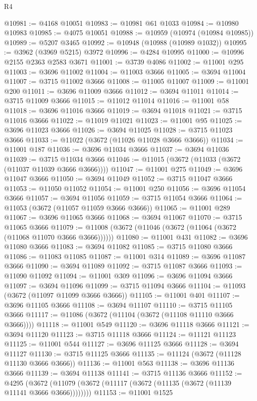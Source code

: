 \begin{lexlean}{R4}
\begin{coremodule}
@10981 := @4168 @10051
@10983 := @10981 @61 @1033
@10984 := @10980 @10983
@10985 := @4075 @10051
@10988 := @10959 (@10974 (@10984 @10985))
@10989 := @5207 @3465
@10992 := @10948 (@10988 (@10989 @1032))
@10995 := @3962 (@3969 @5215) @3972
@10996 := @4284 @10995
@11000 := @10996 @2155 @2363 @2583 @3671
@11001 := @3739 @4086
@11002 := @11001 @295
@11003 := @3696 @11002
@11004 := @11003 @3666
@11005 := @3694 @11004
@11007 := @3715 @11002 @3666
@11008 := @11005 @11007
@11009 := @11001 @200
@11011 := @3696 @11009 @3666
@11012 := @3694 @11011
@11014 := @3715 @11009 @3666
@11015 := @11012 @11014
@11016 := @11001 @58
@11018 := @3696 @11016 @3666
@11019 := @3694 @11018
@11021 := @3715 @11016 @3666
@11022 := @11019 @11021
@11023 := @11001 @95
@11025 := @3696 @11023 @3666
@11026 := @3694 @11025
@11028 := @3715 @11023 @3666
@11033 := @11022 (@3672 (@11026 @11028 @3666 @3666))
@11034 := @11001 @187
@11036 := @3696 @11034 @3666
@11037 := @3694 @11036
@11039 := @3715 @11034 @3666
@11046 := @11015 (@3672 (@11033 (@3672 (@11037 @11039 @3666 @3666))))
@11047 := @11001 @275
@11049 := @3696 @11047 @3666
@11050 := @3694 @11049
@11052 := @3715 @11047 @3666
@11053 := @11050 @11052
@11054 := @11001 @250
@11056 := @3696 @11054 @3666
@11057 := @3694 @11056
@11059 := @3715 @11054 @3666
@11064 := @11053 (@3672 (@11057 @11059 @3666 @3666))
@11065 := @11001 @289
@11067 := @3696 @11065 @3666
@11068 := @3694 @11067
@11070 := @3715 @11065 @3666
@11079 := @11008 (@3672 (@11046 (@3672 (@11064 (@3672 (@11068 @11070 @3666 @3666))))))
@11080 := @11001 @431
@11082 := @3696 @11080 @3666
@11083 := @3694 @11082
@11085 := @3715 @11080 @3666
@11086 := @11083 @11085
@11087 := @11001 @314
@11089 := @3696 @11087 @3666
@11090 := @3694 @11089
@11092 := @3715 @11087 @3666
@11093 := @11090 @11092
@11094 := @11001 @309
@11096 := @3696 @11094 @3666
@11097 := @3694 @11096
@11099 := @3715 @11094 @3666
@11104 := @11093 (@3672 (@11097 @11099 @3666 @3666))
@11105 := @11001 @401
@11107 := @3696 @11105 @3666
@11108 := @3694 @11107
@11110 := @3715 @11105 @3666
@11117 := @11086 (@3672 (@11104 (@3672 (@11108 @11110 @3666 @3666))))
@11118 := @11001 @549
@11120 := @3696 @11118 @3666
@11121 := @3694 @11120
@11123 := @3715 @11118 @3666
@11124 := @11121 @11123
@11125 := @11001 @544
@11127 := @3696 @11125 @3666
@11128 := @3694 @11127
@11130 := @3715 @11125 @3666
@11135 := @11124 (@3672 (@11128 @11130 @3666 @3666))
@11136 := @11001 @563
@11138 := @3696 @11136 @3666
@11139 := @3694 @11138
@11141 := @3715 @11136 @3666
@11152 := @4295
    (@3672 (@11079 (@3672 (@11117 (@3672 (@11135 (@3672 (@11139 @11141 @3666 @3666))))))))
@11153 := @11001 @1525

\end{coremodule}
\end{lexlean}
